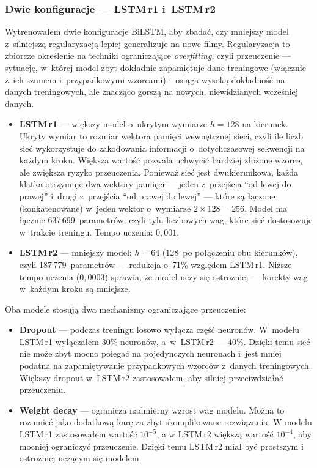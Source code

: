 \subsubsection{Dwie konfiguracje --- LSTM\,r1 i~LSTM\,r2}

Wytrenowałem dwie konfiguracje BiLSTM, aby zbadać, czy mniejszy model z~silniejszą regularyzacją lepiej generalizuje na nowe filmy. Regularyzacja to zbiorcze określenie na techniki ograniczające \textit{overfitting}, czyli przeuczenie --- sytuację, w~której model zbyt dokładnie zapamiętuje dane treningowe (włącznie z~ich szumem i~przypadkowymi wzorcami) i~osiąga wysoką dokładność na danych treningowych, ale znacząco gorszą na nowych, niewidzianych wcześniej danych.

\begin{itemize}
    \item \textbf{LSTM\,r1} --- większy model o~ukrytym wymiarze $h = 128$ na kierunek. Ukryty wymiar to rozmiar wektora pamięci wewnętrznej sieci, czyli ile liczb sieć wykorzystuje do zakodowania informacji o~dotychczasowej sekwencji na każdym kroku. Większa wartość pozwala uchwycić bardziej złożone wzorce, ale zwiększa ryzyko przeuczenia. Ponieważ sieć jest dwukierunkowa, każda klatka otrzymuje dwa wektory pamięci --- jeden z~przejścia ``od lewej do prawej'' i~drugi z~przejścia ``od prawej do lewej'' --- które są łączone (konkatenowane) w~jeden wektor o~wymiarze $2 \times 128 = 256$. Model ma łącznie 637\,699~parametrów, czyli tylu liczbowych wag, które sieć dostosowuje w~trakcie treningu. Tempo uczenia: $0{,}001$.
    \item \textbf{LSTM\,r2} --- mniejszy model: $h = 64$ (128~po połączeniu obu kierunków), czyli 187\,779~parametrów --- redukcja o~71\% względem LSTM\,r1. Niższe tempo uczenia ($0{,}0003$) sprawia, że model uczy się ostrożniej --- korekty wag w~każdym kroku są mniejsze.
\end{itemize}

Oba modele stosują dwa mechanizmy ograniczające przeuczenie:

\begin{itemize}
\item \textbf{Dropout} --- podczas treningu losowo wyłącza część neuronów. W~modelu LSTM\,r1 wyłączałem 30\% neuronów, a~w~LSTM\,r2 --- 40\%. Dzięki temu sieć nie może zbyt mocno polegać na pojedynczych neuronach i~jest mniej podatna na zapamiętywanie przypadkowych wzorców z~danych treningowych. Większy dropout w~LSTM\,r2 zastosowałem, aby silniej przeciwdziałać przeuczeniu.

\item \textbf{Weight decay} --- ogranicza nadmierny wzrost wag modelu. Można to rozumieć jako dodatkową karę za zbyt skomplikowane rozwiązania. W modelu LSTM\,r1 zastosowałem wartość \(10^{-5}\), a w LSTM\,r2 większą wartość \(10^{-4}\), aby mocniej ograniczyć przeuczenie. Dzięki temu LSTM\,r2 miał być prostszym i ostrożniej uczącym się modelem.

\end{itemize}


